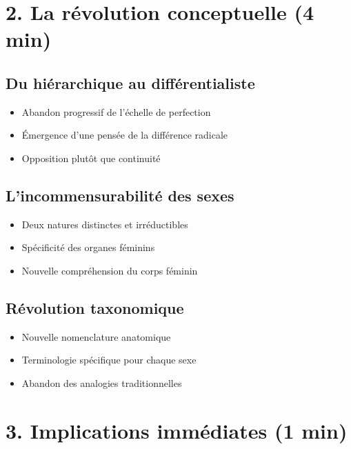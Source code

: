 \documentclass[
  letterpaper,
  DIV=11,
  numbers=noendperiod]{scrreprt}
\providecommand{\tightlist}{%
  \setlength{\itemsep}{0pt}\setlength{\parskip}{0pt}}\usepackage{longtable,booktabs,array}
\begin{document}
\section{2. La révolution conceptuelle (4
min)}\label{la-ruxe9volution-conceptuelle-4-min}

\subsection{Du hiérarchique au
différentialiste}\label{du-hiuxe9rarchique-au-diffuxe9rentialiste}

\begin{itemize}
\tightlist
\item
  Abandon progressif de l'échelle de perfection
\item
  Émergence d'une pensée de la différence radicale
\item
  Opposition plutôt que continuité
\end{itemize}

\subsection{L'incommensurabilité des
sexes}\label{lincommensurabilituxe9-des-sexes}

\begin{itemize}
\tightlist
\item
  Deux natures distinctes et irréductibles
\item
  Spécificité des organes féminins
\item
  Nouvelle compréhension du corps féminin
\end{itemize}

\subsection{Révolution taxonomique}\label{ruxe9volution-taxonomique}

\begin{itemize}
\tightlist
\item
  Nouvelle nomenclature anatomique
\item
  Terminologie spécifique pour chaque sexe
\item
  Abandon des analogies traditionnelles
\end{itemize}

\section{3. Implications immédiates (1
min)}\label{implications-immuxe9diates-1-min}
\end{document}
